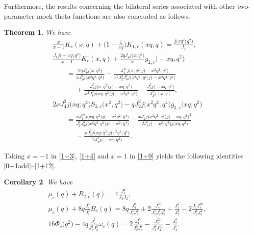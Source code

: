 \documentclass[pdftex]{sigma}
\numberwithin{equation}{section}
\newtheorem{Theorem}{Theorem}[section]
\newtheorem{Corollary}[Theorem]{Corollary}
\begin{document}
Furthermore, the results concerning the bilateral series associated with other two-parameter mock theta functions are also concluded as follows.
\begin{Theorem}\label{0+5}
We have
\begin{gather}
\frac{x}{x-1}K_c(x,q)+\bigg(1-\frac{1}{xq}\bigg)K_{1,c}(xq,q)
=\frac{j\bigl(xq^2;q^2\bigr)}{J_1},\label{1+3}\\
\frac{J_1j\bigl(-xq;q^2\bigr)}{x-1}K_{c}(x,q)
+\frac{2qJ_4j\bigl(x;q^2\bigr)}{x}g_{2,c}\bigl(-xq,q^2\bigr)\nonumber\\
\qquad=\frac{2qJ_4^5j\bigl(x;q^2\bigr)}{xJ_2^2 j\bigl(x^2q^2;q^4\bigr)}
-\frac{J_4^{11}j\bigl(x;q^2\bigr)j\bigl(-x^2q^2;q^4\bigr)}
{x^2J_2^4J_8^4j\bigl(x^2q^2;q^4\bigr)j\bigl(-x^2q^4;q^4\bigr)}\nonumber\\
\phantom{\qquad=}{}+\frac{J_4^5j\bigl(x;q^2\bigr)j\bigl(-xq;q^2\bigr)}
{x^2J_8^2j\bigl(xq;q^2\bigr)j\bigl(-x^2q^4;q^4\bigr)}
-\frac{J_1^5j\bigl(-xq;q^2\bigr)}{J_2^2j(x;q)},\label{1+4}\\
2xJ_4^2j\bigl(xq;q^2\bigr)S_{2,c}\bigl(x^2,q^2\bigr)-qJ_2^2j\bigl(x^2q^2;q^4\bigr)g_{3,c}\bigl(xq,q^2\bigr)\nonumber\\
\qquad=\frac{xJ_4^{12}j\bigl(xq;q^2\bigr)j\bigl(-x^2q^2;q^4\bigr)}{J_2^4J_8^4j\bigl(x^2q^2;q^4\bigr)j\bigl(-x^2;q^4\bigr)}
-\frac{xJ_2^5j\bigl(x^2q^2;q^4\bigr)j\bigl(-xq;q^2\bigr)^2}{2J_4^2j\bigl(-x^2;q^2\bigr)j\bigl(xq;q^2\bigr)}\nonumber\\
\phantom{\qquad=}{}-\frac{xJ_2^5j\bigl(xq;q^2\bigr)j\bigl(x^2q^2;q^4\bigr)}{2J_4^2j\bigl(-x^2;q^2\bigr)}.\label{1+9}
\end{gather}
\end{Theorem}

Taking $x=-1$ in \eqref{1+3}, \eqref{1+4} and $x=1$ in \eqref{1+9} yields the following identities \eqref{0+1add}--\eqref{1+12}.
\begin{Corollary}
We have
\begin{gather}
\mu_c(q)+R_{2,c}(q)=4\frac{J_4^2}{J_1J_2},\label{0+1add}\\
\mu_c(q)+8q\frac{J_4^3}{J_1^3}B_c(q)=8q\frac{J_4^8}{J_1^3J_2^4}
+2\frac{J_4^{20}}{J_1^3J_2^8J_8^8}+\frac{J_1^5}{J_2^4}
-2\frac{J_1J_4^{10}}{J_2^6J_8^4},\label{0+4}\\
16\varPhi_c\bigl(q^2\bigr)-4q\frac{J_2^5}{J_1^2J_4^3}\omega_c(q)
=2\frac{J_4^{17}}{J_2^8J_8^8}-\frac{J_2^{20}}{J_1^8J_4^{11}}
-\frac{J_2^8}{J_4^7}.\label{1+12}
\end{gather}
\end{Corollary}
\end{document}
